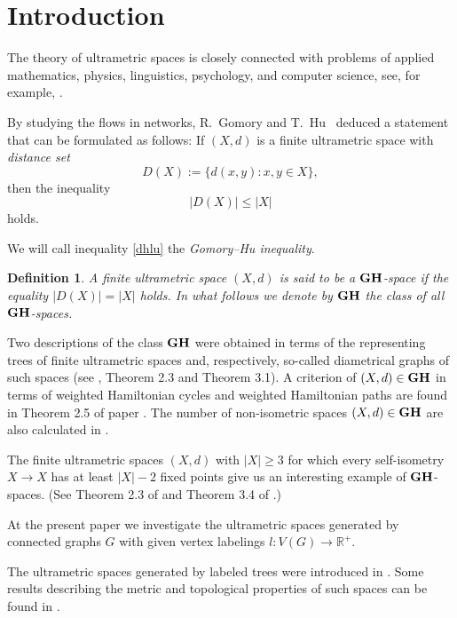 \documentclass[pdflatex,sn-mathphys-num]{sn-jnl}%
\theoremstyle{thmstyleone}%
\theoremstyle{thmstyletwo}%
\theoremstyle{thmstylethree}%
\newtheorem{Definition}[Theorem]{Definition}
\theoremstyle{thmstyletwo}%
\theoremstyle{thmstylethree}%
\begin{document}
\section{Introduction}

The theory of ultrametric spaces is closely connected with problems of applied mathematics, physics, linguistics, psychology, and computer science, see, for example,  \cite{RTV86,Mur04a,Lem00,Mur04b,GSP17,SedaHitzler2008,PriessCrampeRibenboim2000}. 


By studying the flows in networks, R.~Gomory and T.~Hu~\cite{GH1961S} deduced a statement that can be formulated as follows: If $(X,d)$ is a finite ultrametric space with  {\it distance set}
\[
D(X):=\{d(x,y):x,y\in X\},
\]
then the inequality
\begin{equation}
    \label{dhlu}
|D(X)| \le |X|
\end{equation}
holds.

 We will call inequality \eqref{dhlu} the {\it Gomory--Hu inequality}.


\begin{Definition}\label{kahkas}
    A finite ultrametric space $(X,d)$ is said to be a ${\bf GH}$-space if the equality
\(
|D(X)| = |X|
\)
holds. In what follows we denote by ${\bf GH}$ the class of all ${\bf GH}$-spaces.
\end{Definition}

    
Two descriptions of the class ${\bf GH}$ were obtained in terms of the representing trees of finite ultrametric spaces and, respectively, so-called diametrical graphs of such spaces (see \cite{PD2014JMS}, Theorem 2.3 and Theorem 3.1). 
A criterion of $(X,d) \in {\bf GH}$ in terms of weighted Hamiltonian cycles and weighted Hamiltonian paths are found in Theorem 2.5 of  paper \cite{DPT2015}. The number of non-isometric spaces $(X,d) \in {\bf GH}$ are also calculated in \cite{DPT2015}.

The finite ultrametric spaces $(X,d)$ with $|X| \ge 3$ for which every self-isometry $X \to X$ has at least $|X|-2$ fixed points  give us an interesting example of ${\bf GH}$-spaces. (See Theorem 2.3 of \cite{PD2014JMS} and Theorem 3.4 of \cite{DPT2017FPTA}.)

At the present paper we
investigate the ultrametric spaces generated by 
  connected  graphs $G$ with given vertex labelings $l : V(G)\to \mathbb{R}^+$. 

The ultrametric spaces generated by labeled trees were introduced in \cite{Dov2020TaAoG}. Some  results describing the metric and topological properties of such spaces can be found in \cite{DCR2025OJAC,DK2024DLPSSAG,DK2022LTGCCaDUS,DR2026MDPI,DR2026PIGC,DR2026AnComb,DR2025USGbLSG,DV2025JMS}. 
\end{document}
